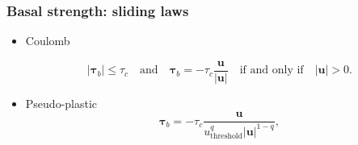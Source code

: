 \documentclass[hide notes,intlimits]{beamer}
\begin{document}
\begin{frame}
  \frametitle{Basal strength: sliding laws}

  \begin{itemize}
  \item Coulomb

    \begin{equation*}
      \label{eq:11}
      |\boldsymbol{\tau}_b| \le \tau_c \quad \text{and} \quad \boldsymbol{\tau}_b =
      - \tau_c \frac{\mathbf{u}}{|\mathbf{u}|} \quad\text{if and only if}\quad |\mathbf{u}| > 0.
    \end{equation*}
  \item Pseudo-plastic
  \begin{equation*}
    \label{eq:10}
    \boldsymbol{\tau}_b =  - \tau_c \frac{\mathbf{u}}{u_{\text{threshold}}^q |\mathbf{u}|^{1-q}},
  \end{equation*}
  \end{itemize}
\end{frame}

\newcommand{\red}[1]{{\color{red} #1}}
\end{document}
